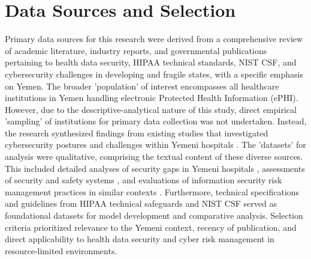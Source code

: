 \documentclass[12pt, a4paper, oneside]{report}
\begin{document}
	\section{Data Sources and Selection}
	Primary data sources for this research were derived from a comprehensive review of academic literature, industry reports, and governmental publications pertaining to health data security, HIPAA technical standards, NIST CSF, and cybersecurity challenges in developing and fragile states, with a specific emphasis on Yemen. The broader 'population' of interest encompasses all healthcare institutions in Yemen handling electronic Protected Health Information (ePHI). However, due to the descriptive-analytical nature of this study, direct empirical 'sampling' of institutions for primary data collection was not undertaken. Instead, the research synthesized findings from existing studies that investigated cybersecurity postures and challenges within Yemeni hospitals \cite{alhammadi2024advancing} \cite{al2025political} \cite{abdulrab2021assessing} \cite{al2023information}. The 'datasets' for analysis were qualitative, comprising the textual content of these diverse sources. This included detailed analyses of security gaps in Yemeni hospitals \cite{abdulrab2021assessing}, assessments of security and safety systems \cite{abdulrab2021assessing}, and evaluations of information security risk management practices in similar contexts \cite{al2023information}. Furthermore, technical specifications and guidelines from HIPAA technical safeguards \cite{hhs2024hipaa} and NIST CSF \cite{rahmany2026aida} served as foundational datasets for model development and comparative analysis. Selection criteria prioritized relevance to the Yemeni context, recency of publication, and direct applicability to health data security and cyber risk management in resource-limited environments.
	
\end{document}
